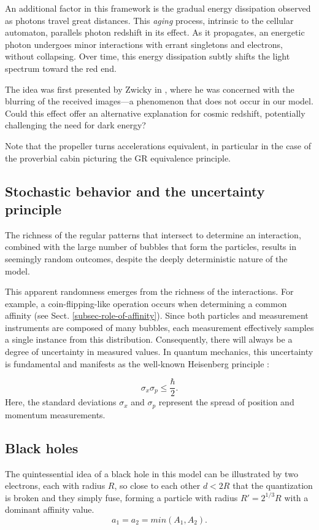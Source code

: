 \documentclass[12pt]{article}
\begin{document}
An additional factor in this framework is the gradual energy dissipation observed as photons travel great distances. This \textit{aging} process, intrinsic to the cellular automaton, parallels photon redshift in its effect. As it propagates, an energetic photon undergoes minor interactions with errant singletons and electrons, without collapsing. Over time, this energy dissipation subtly shifts the light spectrum toward the red end.

The idea was first presented by Zwicky in \cite{zwicky1929redshift}, where he was concerned with the blurring of the received images—a phenomenon that does not occur in our model. Could this effect offer an alternative explanation for cosmic redshift, potentially challenging the need for dark energy?

Note that the propeller turns accelerations equivalent, in particular in the case of the proverbial cabin picturing the GR equivalence principle.

\subsection{Stochastic behavior and the uncertainty principle}

The richness of the regular patterns that intersect to determine an interaction, combined with the large number of bubbles that form the particles, results in seemingly random outcomes, despite the deeply deterministic nature of the model.

This apparent randomness emerges from the richness of the interactions. For example, a coin-flipping-like operation occurs when determining a common affinity (see Sect. \ref{subsec-role-of-affinity}). Since both particles and measurement instruments are composed of many bubbles, each measurement effectively samples a single instance from this distribution. Consequently, there will always be a degree of uncertainty in measured values. In quantum mechanics, this uncertainty is fundamental and manifests as the well-known Heisenberg principle \cite{Heisenberg1927}:

\[
\sigma_x \sigma_p \leq \frac{\hbar}{2}.
\]
Here, the standard deviations $\sigma_x$ and $\sigma_p$ represent the spread of position and momentum measurements.

\subsection{Black holes}
The quintessential idea of a black hole in this model can be illustrated by two electrons, each with radius $R$, so close to each other $d<2R$ that the quantization is broken and they simply fuse, forming a particle with radius $R'=2^{1/3}R$ with a dominant affinity value. 
\[
a_1 = a_2 = min(A_1,A_2).
\]
\end{document}
